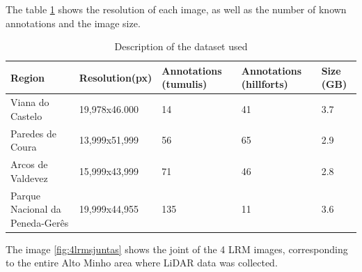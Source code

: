 The table \ref{resolucaoLRM} shows the resolution of each image, as well as the number of known annotations and the image size.

\begin{table}[h!]
\centering
\begin{tabular}{|p{3cm}|p{2.5cm}|p{2cm}|p{2cm}|p{2cm}|} 
 \hline
  Region & Resolution(px) & Annotations (tumulis) & Annotations (hillforts) & Size (GB) \\ [0.5ex] 
 \hline\hline
 Viana do Castelo & 19,978x46.000 & 14 & 41 & 3.7\\ 
 Paredes de Coura & 13,999x51,999 & 56 & 65 & 2.9 \\
 Arcos de Valdevez & 15,999x43,999 & 71 & 46 & 2.8\\
 Parque Nacional da Peneda-Gerês & 19,999x44,955 & 135 & 11 & 3.6\\ [1ex] 
 \hline
\end{tabular}
\caption{Description of the dataset used}
\label{resolucaoLRM}
\end{table}

The image \ref{fig:4lrmsjuntas} shows the joint of the 4 LRM images, corresponding to the entire Alto Minho area where LiDAR data was collected.

